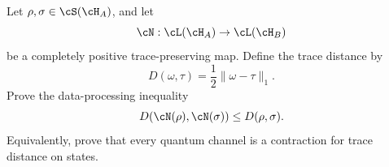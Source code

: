 Let $\rho,\sigma\in\cS(\cH_A)$, and let
$$
\cN:\cL(\cH_A)\to\cL(\cH_B)
$$
be a completely positive trace-preserving map. Define the trace distance by
$$
D(\omega,\tau)=\frac{1}{2}\|\omega-\tau\|_1.
$$
Prove the data-processing inequality
$$
D(\cN(\rho),\cN(\sigma))
\leq
D(\rho,\sigma).
$$
Equivalently, prove that every quantum channel is a contraction for trace distance on states.
